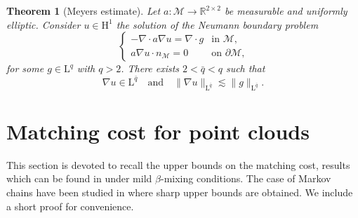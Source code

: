 \documentclass[11pt,a4paper,oneside]{amsart}
\numberwithin{equation}{section}
\newtheorem{theorem}{Theorem}[section]
\newcommand{\LL}{\mathrm{L}}
\newcommand{\nc}[1]{\textcolor{red}{[N: #1]}}
\begin{document}
%
\begin{theorem}[Meyers estimate]\label{Meyers}
%
Let $a : \mathcal{M}\rightarrow \mathbb{R}^{2\times 2}$ be measurable and uniformly elliptic. Consider $u\in \mathrm{H}^1$ the solution of the Neumann boundary problem
%
$$
 \left\{
    \begin{array}{ll}
        -\nabla\cdot a\nabla u=\nabla\cdot g & \text{in $\mathcal{M}$,} \\
        a\nabla u\cdot n_{\mathcal{M}}=0 & \text{on $\partial\mathcal{M}$,}
    \end{array}
\right.
$$
%
for some $g\in \LL^q$ with $q>2$. There exists $2<\bar q<q$ such that 
%
$$\nabla u\in \LL^{\bar q} \quad\text{and}\quad \|\nabla u\|_{\LL^{\bar q}}\lesssim \|g\|_{\LL^{\bar{q}}}.$$
%
\end{theorem}
%
\section{Matching cost for point clouds}\label{sec:matchcost}
%
This section is devoted to recall the upper bounds on the matching cost, results which can be found in \cite[Theorem 2]{borda2021empirical} under mild $\beta$-mixing conditions. The case of Markov chains have been studied in \cite{Riekert, Fournier2015} where sharp upper bounds are obtained. We include a short proof for convenience. %
%
\end{document}
